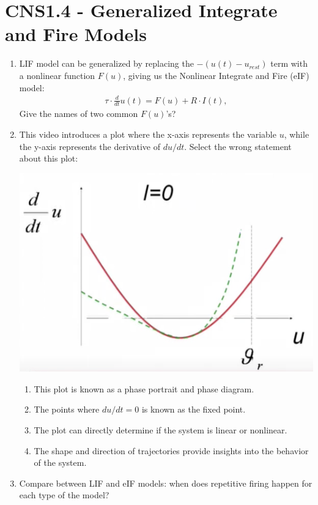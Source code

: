 \documentclass[11pt,letterpaper]{article}
\begin{document}
\section{CNS1.4 - Generalized Integrate and Fire Models}
\begin{enumerate}
     \item LIF model can be generalized by replacing the $- \left( u(t) - u_{rest}\right)$ term with a nonlinear function $F(u)$, giving us the Nonlinear Integrate and Fire (eIF) model:
    \begin{align*}
        \tau \cdot \frac{d}{dt} u(t) = F(u) + R \cdot I(t),
    \end{align*}
    Give the names of two common $F(u)$'s?
    \vspace{1 cm}

    \item This video introduces a plot where the x-axis represents the variable $u$, while the y-axis represents the derivative of $du/dt$. Select the wrong statement about this plot:
    \begin{center}
        \includegraphics[scale=0.4]{4.1.png}
    \end{center}
    \begin{enumerate}
        \item This plot is known as a phase portrait and phase diagram.
        \item The points where $du/dt = 0$ is known as the fixed point.
        \item The plot can directly determine if the system is linear or nonlinear.
        \item The shape and direction of trajectories provide insights into the behavior of the system.
    \end{enumerate}

    \item Compare between LIF and eIF models: when does repetitive firing happen for each type of the model? 
\end{enumerate}
\pagebreak
\end{document}
